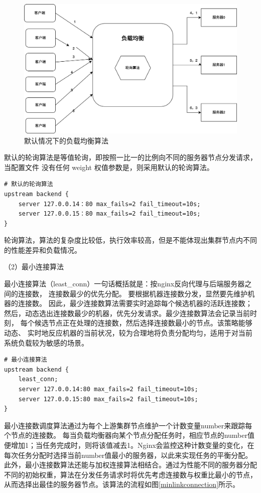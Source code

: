 \begin{figure}[htb]
	\centering
	\includegraphics[width=\textwidth]{figures/round-robin.png}
	\caption{默认情况下的负载均衡算法}
\end{figure}

默认的轮询算法是等值轮询，即按照一比一的比例向不同的服务器节点分发请求，当配置文件
没有任何 weight 权值参数是，则采用默认的轮询算法。

\begin{lstlisting}
# 默认的轮询算法
upstream backend {
    server 127.0.0.14：80 max_fails=2 fail_timeout=10s;
    server 127.0.0.15：80 max_fails=2 fail_timeout=10s;
}
\end{lstlisting}

轮询算法，算法的复杂度比较低，执行效率较高，但是不能体现出集群节点内不同的性能差异和负载情况。

（2）最小连接算法

最小连接算法（least\_conn）一句话概括就是：按nginx反向代理与后端服务器之间的连接数，
连接数最少的优先分配\cite{周常志2023基于改进加权最小连接数的微服务负载均衡算法研究}。
要根据机器连接数分发，显然要先维护机器的连接数。
因此，最少连接数算法需要实时追踪每个候选机器的活跃连接数；
然后，动态选出连接数最少的机器，优先分发请求。最少连接数算法会记录当前时刻，
每个候选节点正在处理的连接数，然后选择连接数最小的节点。该策略能够动态、
实时地反应机器的当前状况，较为合理地将负责分配均匀，适用于对当前系统负载较为敏感的场景。

\begin{lstlisting}
# 最小连接算法
upstream backend {
    least_conn;
    server 127.0.0.14:80 max_fails=2 fail_timeout=10s;
    server 127.0.0.15:80 max_fails=2 fail_timeout=10s;
}
\end{lstlisting}

最小连接数调度算法通过为每个上游集群节点维护一个计数变量number来跟踪每个节点的连接数。
每当负载均衡器向某个节点分配任务时，相应节点的number值便增加1；当任务完成时，则将该值减去1。Nginx会监控这种计数变量的变化，在每次任务分配时选择当前number值最小的服务器，以此来实现任务的平衡分配。此外，最小连接数算法还能与加权连接算法相结合。通过为性能不同的服务器分配不同的初始权重，算法在分发任务请求时将优先考虑连接数与权重比最小的节点，从而选择出最佳的服务器节点。该算法的流程如图\ref{minlinkconnection}所示。

